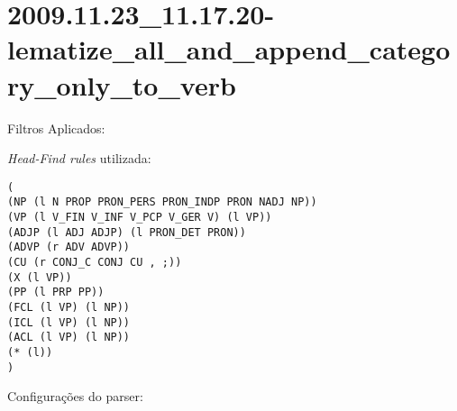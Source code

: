 \section{2009.11.23_11.17.20-lematize_all_and_append_category_only_to_verb} %
\label{sec:exp:2009.11.23_11.17.20-lematize_all_and_append_category_only_to_verb}

Filtros Aplicados:

\begin{itemize}
  
  \item{\emph{LematizeAllAndAppendCategoryOnlyToVerb}
  
\end{itemize}

\emph{Head-Find rules} utilizada:

\scriptsize
\begin{verbatim}
(
(NP (l N PROP PRON_PERS PRON_INDP PRON NADJ NP))
(VP (l V_FIN V_INF V_PCP V_GER V) (l VP))
(ADJP (l ADJ ADJP) (l PRON_DET PRON))
(ADVP (r ADV ADVP))
(CU (r CONJ_C CONJ CU , ;))
(X (l VP))
(PP (l PRP PP))
(FCL (l VP) (l NP))
(ICL (l VP) (l NP))
(ACL (l VP) (l NP))
(* (l))
)

\end{verbatim}

\normalsize

Configurações do parser:

